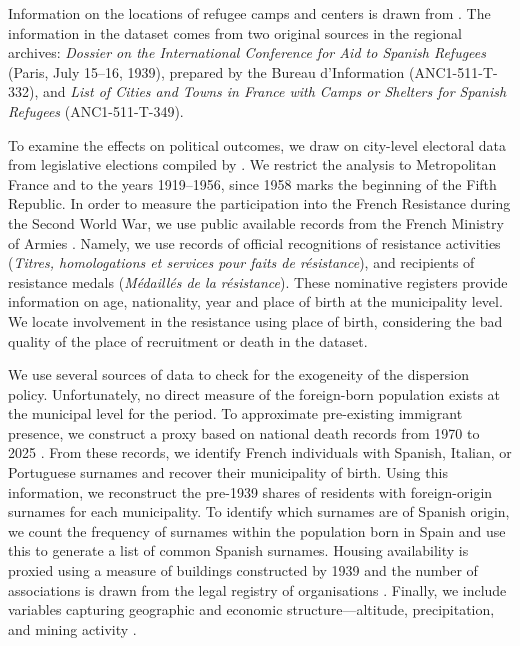 Information on the locations of refugee camps and centers is drawn from \citet{generalitat_de_catalunya_relacio_2020}. The information in the dataset comes from two original sources in the regional archives: \textit{Dossier on the International Conference for Aid to Spanish Refugees} (Paris, July 15–16, 1939), prepared by the Bureau d'Information (ANC1-511-T-332), and \textit{List of Cities and Towns in France with Camps or Shelters for Spanish Refugees} (ANC1-511-T-349).

To examine the effects on political outcomes, we draw on city-level electoral data from legislative elections compiled by \citet{piketty_histoire_2023}. We restrict the analysis to Metropolitan France and to the years 1919–1956, since 1958 marks the beginning of the Fifth Republic. In order to measure the participation into the French Resistance during the Second World War, we use public available records from the French Ministry of Armies \citep{ministry_of_the_armed_forces_memoire_2022}. Namely, we use records of official recognitions of resistance activities (\textit{Titres, homologations et services pour faits de résistance}), and recipients of resistance medals (\textit{Médaillés de la résistance}). These nominative registers provide information on age, nationality, year and place of birth at the municipality level. We locate involvement in the resistance using place of birth, considering the bad quality of the place of recruitment or death in the dataset. 


We use several sources of data to check for the exogeneity of the dispersion policy. Unfortunately, no direct measure of the foreign-born population exists at the municipal level for the period. To approximate pre-existing immigrant presence, we construct a proxy based on national death records from 1970 to 2025 \citep{insee_deces_2025}. From these records, we identify French individuals with Spanish, Italian, or Portuguese surnames and recover their municipality of birth. Using this information, we reconstruct the pre-1939 shares of residents with foreign-origin surnames for each municipality. To identify which surnames are of Spanish origin, we count the frequency of surnames within the population born in Spain and use this to generate a list of common Spanish surnames. Housing availability is proxied using a measure of buildings constructed by 1939 \citep{insee1968logements} and the number of associations is drawn from the legal registry of organisations \citep{dila_journalofficiel_portal}. Finally, we include variables capturing geographic and economic structure—altitude, precipitation, and mining activity \citep{pauling2006,camino2021}. 


